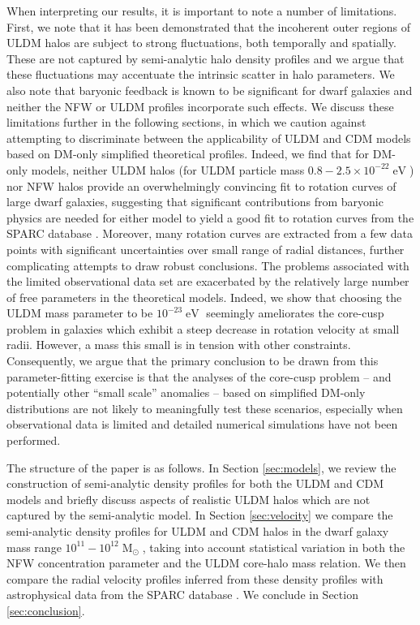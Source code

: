 \documentclass{pasa}%
\begin{document}
When interpreting our results, it is important to note a number of limitations. First, we note that it has been demonstrated that the incoherent outer regions of ULDM halos are subject to strong fluctuations, both temporally and spatially. These are not captured by semi-analytic halo density profiles and we argue that these fluctuations may accentuate the intrinsic scatter in halo parameters. We also note that baryonic feedback is known to be significant for dwarf galaxies \cite{2018MNRAS.473.5698D, Benitez-Llambay:2018} and neither the NFW or ULDM profiles incorporate such effects. We discuss these limitations further in the following sections, in which we caution against attempting to discriminate between the applicability of ULDM and CDM models based on DM-only simplified theoretical profiles. Indeed, we find that for DM-only models, neither ULDM halos (for ULDM particle mass $0.8-2.5\times 10^{-22} \operatorname{eV}$) nor NFW halos provide an overwhelmingly convincing fit to rotation curves of large dwarf galaxies, suggesting that significant contributions from baryonic physics are needed for either model to yield a good fit to rotation curves from the SPARC database \cite{Lelli:2016zqa}. Moreover, many rotation curves are extracted from a few data points with significant uncertainties over small range of radial distances, further complicating attempts to draw robust conclusions. The problems associated with the limited observational data set are exacerbated by the relatively large number of free parameters in the theoretical models. Indeed, we show that choosing the ULDM mass parameter to be $10^{-23}\operatorname{eV}$ seemingly ameliorates the core-cusp problem in galaxies which exhibit a steep decrease in rotation velocity at small radii. However, a mass this small is in tension with other constraints. Consequently, we argue that the primary conclusion to be drawn from this parameter-fitting exercise is that the analyses of the core-cusp problem -- and potentially other ``small scale'' anomalies -- based on simplified DM-only distributions are not likely to meaningfully test these scenarios, especially when observational data is limited and detailed numerical simulations have not been performed. 

The structure of the paper is as follows. In Section \ref{sec:models}, we review the construction of semi-analytic density profiles for both the ULDM and CDM models and briefly discuss aspects of realistic ULDM halos which are not captured by the semi-analytic model. In Section \ref{sec:velocity} we compare the semi-analytic density profiles for ULDM and CDM halos in the dwarf galaxy mass range $10^{11} - 10^{12}\operatorname{M}_{\odot}$, taking into account statistical variation in both the NFW concentration parameter and the ULDM core-halo mass relation. We then compare the radial velocity profiles inferred from these density profiles with astrophysical data from the SPARC database \cite{Lelli:2016zqa}. We conclude in Section \ref{sec:conclusion}.
\end{document}
